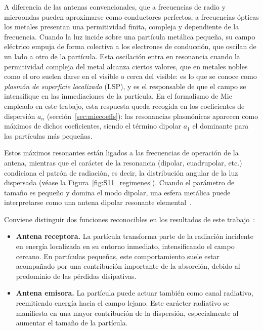 A diferencia de las antenas convencionales, que a frecuencias de radio y
microondas pueden aproximarse como conductores perfectos, a frecuencias
ópticas los metales presentan una permitividad finita, compleja y dependiente
de la frecuencia. Cuando la luz incide sobre una partícula metálica pequeña,
su campo eléctrico empuja de forma colectiva a los electrones de conducción,
que oscilan de un lado a otro de la partícula. Esta oscilación entra en
resonancia cuando la permitividad compleja del metal alcanza ciertos valores,
que en metales nobles como el oro suelen darse en el visible o cerca del
visible: es lo que se conoce como \emph{plasmón de superficie localizado}
(LSP), y es el responsable de que el campo se intensifique en las
inmediaciones de la partícula. En el formalismo de Mie empleado en este
trabajo, esta respuesta queda recogida en los coeficientes de dispersión
$a_n$ (sección~\ref{sec:miecoeffs}): las resonancias plasmónicas aparecen como
máximos de dichos coeficientes, siendo el término dipolar $a_1$ el dominante
para las partículas más pequeñas.

Estos máximos resonantes están ligados a las frecuencias de operación de la
antena, mientras que el carácter de la resonancia (dipolar, cuadrupolar,
etc.) condiciona el patrón de radiación, es decir, la distribución angular de
la luz dispersada (véase la Figura~\ref{fig:S11_regimenes}). Cuando el
parámetro de tamaño es pequeño y domina el modo dipolar, una esfera metálica
puede interpretarse como una antena dipolar resonante elemental~\cite{Kuhn2006}.

Conviene distinguir dos funciones reconocibles en los
resultados de este trabajo~\cite{Kolwas2013}:

\begin{itemize}
  \item \textbf{Antena receptora.} La partícula transforma parte de la
        radiación incidente en energía localizada en su entorno inmediato,
        intensificando el campo cercano. En partículas pequeñas, este
        comportamiento suele estar acompañado por una contribución importante
        de la absorción, debido al predominio de las pérdidas disipativas.
  \item \textbf{Antena emisora.} La partícula puede actuar también como canal
        radiativo, reemitiendo energía hacia el campo lejano. Este carácter
        radiativo se manifiesta en una mayor contribución de la dispersión,
        especialmente al aumentar el tamaño de la partícula.
\end{itemize}

